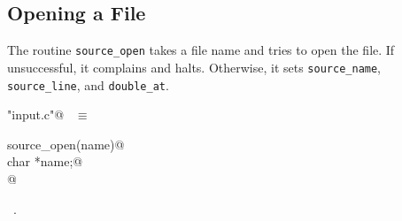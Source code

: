 \documentclass{report}
\begin{document}
\subsection{Opening a File}

The routine \verb|source_open| takes a file name and tries to open the
file. If unsuccessful, it complains and halts. Otherwise, it sets 
\verb|source_name|, \verb|source_line|, and \verb|double_at|.
\begin{flushleft} \small
\begin{minipage}{\linewidth} \label{scrap145}
\verb@"input.c"@\nobreak\ {\footnotesize {} }$\equiv$
\vspace{-1ex}
\begin{list}{}{} \item
\mbox{}\verb@void source_open(name)@\\
\mbox{}\verb@     char *name;@\\
\mbox{}@\\
\mbox{}\verb@@{\NWsep}
\end{list}
\vspace{-1ex}
\footnotesize\addtolength{\baselineskip}{-1ex}
\begin{list}{}{\setlength{\itemsep}{-\parsep}\setlength{\itemindent}{-\leftmargin}}
\item \NWtxtFileDefBy\ .
\end{list}
\vspace{-2ex}
\footnotesize\addtolength{\baselineskip}{-1ex}

\end{minipage}
\end{flushleft}
\end{document}
